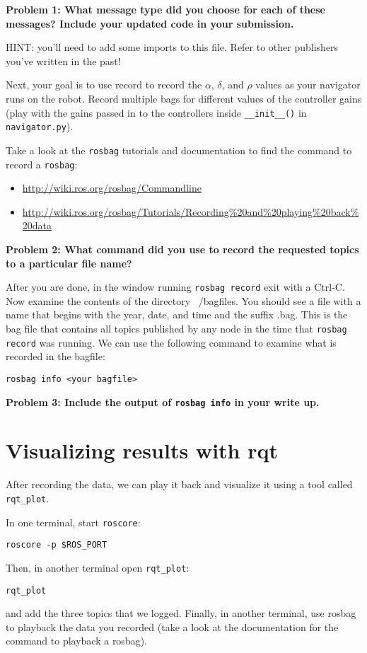 \documentclass{article}
\begin{document}
\textbf{Problem 1: What message type did you choose for each of these messages? Include your updated code in your submission.}

HINT: you'll need to add some imports to this file. Refer to other publishers you've written in the past!

Next, your goal is to use record to record the $\alpha$, $\delta$, and $\rho$ values as your navigator runs on the robot. 
Record multiple bags for different values of the controller gains (play with the gains passed in to the controllers inside \texttt{\_\_init\_\_()} in \texttt{navigator.py}).

Take a look at the 
\texttt{rosbag} tutorials and documentation to find the command to record a \texttt{rosbag}:
\begin{itemize}
    \item \url{http://wiki.ros.org/rosbag/Commandline}
    \item \url{http://wiki.ros.org/rosbag/Tutorials/Recording\%20and\%20playing\%20back\%20data}
\end{itemize}

\textbf{Problem 2: What command did you use to record the requested topics to a particular file name?}

After you are done, in the window  running \texttt{rosbag record} exit with a Ctrl-C. Now examine the contents of the directory ~/bagfiles. You should see a file with a name that begins with the year, date, and time and the suffix .bag. This is the bag file that contains all topics published by any node in the time that \texttt{rosbag record} was running.
We can use the following command to examine what is recorded in the bagfile:
\begin{lstlisting}
rosbag info <your bagfile>
\end{lstlisting}

\textbf{Problem 3: Include the output of \texttt{rosbag info} in your write up.}
\section{Visualizing results with rqt}
After recording the data, we can play it back and visualize it using a tool called \texttt{rqt\_plot}. 

In one terminal, start \texttt{roscore}:
\begin{lstlisting}
roscore -p $ROS_PORT
\end{lstlisting}
Then, in another terminal open \texttt{rqt\_plot}:
\begin{lstlisting}
rqt_plot
\end{lstlisting}
and add the three topics that we logged. 
Finally, in another terminal, use rosbag to playback the data you recorded (take a look at the documentation for the command to playback a rosbag).
\end{document}
